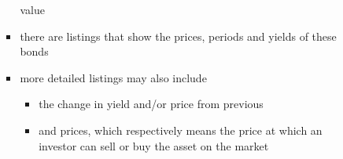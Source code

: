 \documentclass[notoc,notitlepage]{tufte-book}
\begin{document}
\begin{itemize}
\begin{itemize}
\begin{itemize}
            value
          \item there are listings that show the prices, periods and yields
            of these bonds
          \item more detailed listings may also include
            \begin{itemize}
              \item the change in yield and/or price from previous
              \item {} and  prices,
                which respectively means the price at which
                an investor can sell or buy the asset on the market
            \end{itemize}
        \end{itemize}
    \end{itemize}
\end{itemize}



\appendix

\backmatter

\fancyhead[LE]{\thepage \enspace \textsl{\leftmark}}



\printindex
\end{document}
